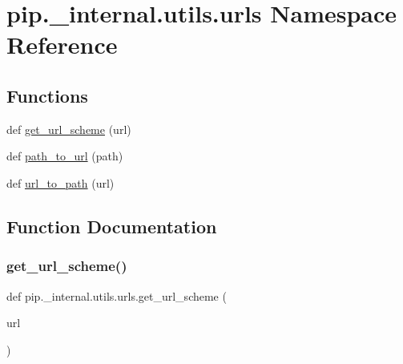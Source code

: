 \hypertarget{namespacepip_1_1__internal_1_1utils_1_1urls}{}\section{pip.\+\_\+internal.\+utils.\+urls Namespace Reference}
\label{namespacepip_1_1__internal_1_1utils_1_1urls}
\subsection*{Functions}
\begin{DoxyCompactItemize}
\item 
def \hyperlink{namespacepip_1_1__internal_1_1utils_1_1urls_ad87043afb534368959c3a324598b96f5}{get\+\_\+url\+\_\+scheme} (url)
\item 
def \hyperlink{namespacepip_1_1__internal_1_1utils_1_1urls_a789117f8d3114e952ead88416e5493d9}{path\+\_\+to\+\_\+url} (path)
\item 
def \hyperlink{namespacepip_1_1__internal_1_1utils_1_1urls_a3de8091daa436638c4e3104ba125beb6}{url\+\_\+to\+\_\+path} (url)
\end{DoxyCompactItemize}


\subsection{Function Documentation}
\mbox{\label{namespacepip_1_1__internal_1_1utils_1_1urls_ad87043afb534368959c3a324598b96f5}} 
\subsubsection{\texorpdfstring{get\+\_\+url\+\_\+scheme()}{get\_url\_scheme()}}
{\footnotesize\ttfamily def pip.\+\_\+internal.\+utils.\+urls.\+get\+\_\+url\+\_\+scheme (\begin{DoxyParamCaption}\item[{}]{url }\end{DoxyParamCaption})}

\mbox{\label{namespacepip_1_1__internal_1_1utils_1_1urls_a789117f8d3114e952ead88416e5493d9}} 
